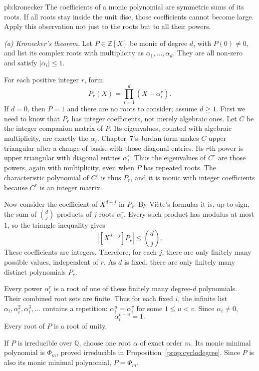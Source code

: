 \begin{solution}{pb:kronecker}
\idea The coefficients of a monic polynomial are symmetric sums of its roots. If all roots stay inside the unit disc, those coefficients cannot become large. Apply this observation not just to the roots but to all their powers.

\writeup \emph{(a) Kronecker's theorem.}
Let $P\in\mathbb Z[X]$ be monic of degree $d$, with $P(0)\ne0$, and list its complex roots with multiplicity as $\alpha_1,\ldots,\alpha_d$. They are all non-zero and satisfy $|\alpha_i|\le1$.

For each positive integer $r$, form
\[
P_r(X)=\prod_{i=1}^d(X-\alpha_i^r).
\]
If $d=0$, then $P=1$ and there are no roots to consider; assume $d\ge1$.
First we need to know that $P_r$ has integer coefficients, not merely algebraic ones. Let $C$ be the integer companion matrix of $P$. Its eigenvalues, counted with algebraic multiplicity, are exactly the $\alpha_i$. Chapter~7's Jordan form makes $C$ upper triangular after a change of basis, with those diagonal entries. Its $r$th power is upper triangular with diagonal entries $\alpha_i^r$. Thus the eigenvalues of $C^r$ are those powers, again with multiplicity, even when $P$ has repeated roots. The characteristic polynomial of $C^r$ is thus $P_r$, and it is monic with integer coefficients because $C^r$ is an integer matrix.

Now consider the coefficient of $X^{d-j}$ in $P_r$. By Viète's formulas it is, up to sign, the sum of $\binom dj$ products of $j$ roots $\alpha_i^r$. Every such product has modulus at most $1$, so the triangle inequality gives
\[
\left|[X^{d-j}]P_r\right|\le\binom dj.
\]
These coefficients are integers. Therefore, for each $j$, there are only finitely many possible values, independent of $r$. As $d$ is fixed, there are only finitely many distinct polynomials $P_r$.

Every power $\alpha_i^r$ is a root of one of these finitely many degree-$d$ polynomials. Their combined root sets are finite. Thus for each fixed $i$, the infinite list $\alpha_i,\alpha_i^2,\alpha_i^3,\ldots$ contains a repetition: $\alpha_i^u=\alpha_i^v$ for some $1\le u<v$. Since $\alpha_i\ne0$,
\[
\alpha_i^{v-u}=1.
\]
Every root of $P$ is a root of unity.

If $P$ is irreducible over $\mathbb Q$, choose one root $\alpha$ of exact order $m$. Its monic minimal polynomial is $\Phi_m$, proved irreducible in Proposition~\ref{prop:cyclodegree}. Since $P$ is also its monic minimal polynomial, $P=\Phi_m$.


\end{solution}
